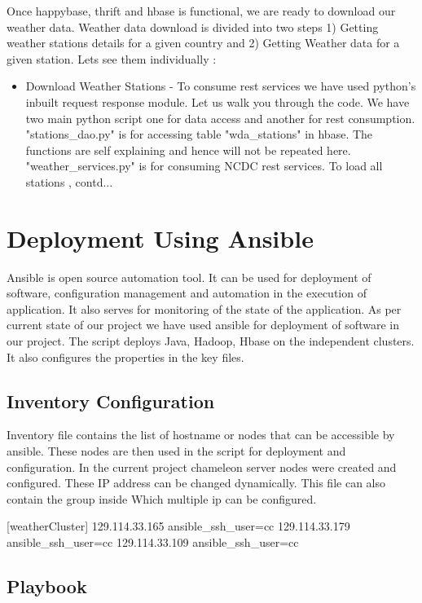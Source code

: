 \documentclass[9pt,twocolumn,twoside]{../../styles/osajnl}
\begin{document}
Once happybase, thrift and hbase is functional, we are ready to download our weather data. Weather data download is divided into two steps 1) Getting weather stations details for a given country and 2) Getting Weather data for a given station. Lets see them individually :
\begin{itemize}
\item Download Weather Stations - To consume rest services we have used python's inbuilt request response module.  Let us walk you through the code. We have two main python script one for data access and another for rest consumption. "stations_dao.py" is for accessing table "wda_stations" in hbase. The functions are self explaining and hence will not be repeated here. "weather_services.py" is for consuming NCDC rest services. To load all stations , contd...

\end{itemize}

\section{Deployment Using Ansible}

Ansible is open source automation tool. It can be used for deployment of software, configuration  management and automation in the execution of application. 
It also serves for monitoring of the state of the application. As per current state of our project we have used ansible for deployment of software in our project. 
The script deploys Java, Hadoop, Hbase on the independent clusters. It also configures the properties in the key files. 

\subsection{Inventory Configuration}

Inventory file contains the list of hostname or nodes that can be accessible by ansible. These nodes are then used in the script for deployment and configuration. 
In the current project chameleon server nodes were created and configured. These IP address can be changed dynamically. This file can also contain the group inside 
Which multiple ip can be configured.

[weatherCluster]
129.114.33.165 ansible_ssh_user=cc
129.114.33.179 ansible_ssh_user=cc
129.114.33.109 ansible_ssh_user=cc

\subsection{Playbook}
\end{document}
